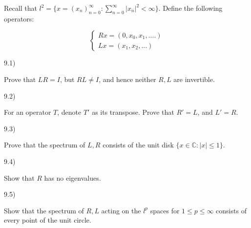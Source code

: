\documentclass[10pt]{article}
\newenvironment{problem}[2][]{\begin{trivlist}
\item[\hskip \labelsep {\bfseries #1}\hskip \labelsep {\bfseries #2.}]}{\end{trivlist}}
\begin{document}
\begin{problem}{Question 9}

Recall that $l^2 = \{ x = (x_n)_{n=0}^\infty : \sum_{n=0}^\infty |x_n|^2 < \infty \}$. Define the following operators:

$$\begin{cases} Rx = (0, x_0, x_1,....) \\ Lx = (x_1,x_2,...) \end{cases} $$

9.1)

Prove that $LR = I$, but $RL \not = I$, and hence neither $R, L$ are invertible.

9.2)

For an operator $T$, denote $T'$ as its transpose. Prove that $R' = L$, and $L' = R$.

9.3)

Prove that the spectrum of $L, R$ consists of the unit disk $ \{ x \in \mathbb{C} : |x| \leq 1 \}$.

9.4)

Show that $R$ has no eigenvalues.

9.5)

Show that the spectrum of $R, L$ acting on the $l^p$ spaces for $1 \leq p \leq \infty$ consists of every point of the unit circle. 

\end{problem}
\end{document}
